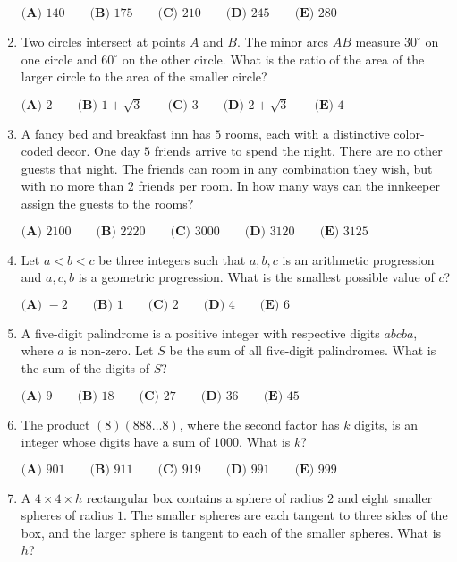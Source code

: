 \documentclass{article}
\begin{document}
\begin{enumerate}[label=\arabic*., itemsep=0.5em]
$\textbf{(A) }140\qquad
\textbf{(B) }175\qquad
\textbf{(C) }210\qquad
\textbf{(D) }245\qquad
\textbf{(E) }280\qquad$\par \vspace{0.5em}\item Two circles intersect at points $A$ and $B$.  The minor arcs $AB$ measure $30^\circ$ on one circle and $60^\circ$ on the other circle.  What is the ratio of the area of the larger circle to the area of the smaller circle?

$\textbf{(A) }2\qquad
\textbf{(B) }1+\sqrt3\qquad
\textbf{(C) }3\qquad
\textbf{(D) }2+\sqrt3\qquad
\textbf{(E) }4\qquad$\par \vspace{0.5em}\item A fancy bed and breakfast inn has $5$ rooms, each with a distinctive color-coded decor.  One day $5$ friends arrive to spend the night.  There are no other guests that night.  The friends can room in any combination they wish, but with no more than $2$ friends per room.  In how many ways can the innkeeper assign the guests to the rooms?

$\textbf{(A) }2100\qquad
\textbf{(B) }2220\qquad
\textbf{(C) }3000\qquad
\textbf{(D) }3120\qquad
\textbf{(E) }3125\qquad$\par \vspace{0.5em}\item Let $a<b<c$ be three integers such that $a,b,c$ is an arithmetic progression and $a,c,b$ is a geometric progression.  What is the smallest possible value of $c$?

$\textbf{(A) }-2\qquad
\textbf{(B) }1\qquad
\textbf{(C) }2\qquad
\textbf{(D) }4\qquad
\textbf{(E) }6\qquad$\par \vspace{0.5em}\item A five-digit palindrome is a positive integer with respective digits $abcba$, where $a$ is non-zero.  Let $S$ be the sum of all five-digit palindromes.  What is the sum of the digits of $S$?

$\textbf{(A) }9\qquad
\textbf{(B) }18\qquad
\textbf{(C) }27\qquad
\textbf{(D) }36\qquad
\textbf{(E) }45\qquad$\par \vspace{0.5em}\item The product $(8)(888\ldots 8)$, where the second factor has $k$ digits, is an integer whose digits have a sum of $1000$.  What is $k$?

$\textbf{(A) }901\qquad
\textbf{(B) }911\qquad
\textbf{(C) }919\qquad
\textbf{(D) }991\qquad
\textbf{(E) }999\qquad$\par \vspace{0.5em}\item A $4\times 4\times h$ rectangular box contains a sphere of radius $2$ and eight smaller spheres of radius $1$.  The smaller spheres are each tangent to three sides of the box, and the larger sphere is tangent to each of the smaller spheres.  What is $h$?


\end{enumerate}
\end{document}
